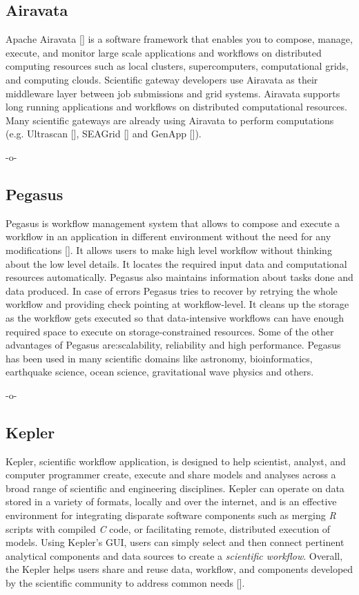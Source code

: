 \subsection{Airavata}

Apache Airavata [\cite{www-airavata}] is a software framework that
enables you to compose, manage, execute, and monitor large scale
applications and workflows on distributed computing resources such as
local clusters, supercomputers, computational grids, and computing
clouds. Scientific gateway developers use Airavata as their middleware
layer between job submissions and grid systems. Airavata supports long
running applications and workflows on distributed computational
resources. Many scientific gateways are already using Airavata to
perform computations (e.g. Ultrascan [\cite{www-ultrascan}],
SEAGrid [\cite{www-seagrid}] and GenApp [\cite{www-genapp}]).

   -o-

\subsection{Pegasus}\label{S:pegasus}

Pegasus is workflow management system that allows to compose and
execute a workflow in an application in different environment without
the need for any modifications [\cite{www-Pegasus}]. It allows users to
make high level workflow without thinking about the low level
details. It locates the required input data and computational
resources automatically.  Pegasus also maintains information about
tasks done and data produced. In case of errors Pegasus tries to
recover by retrying the whole workflow and providing check pointing at
workflow-level.  It cleans up the storage as the workflow gets
executed so that data-intensive workflows can have enough required
space to execute on storage-constrained resources. Some of the other
advantages of Pegasus are:scalability, reliability and high
performance. Pegasus has been used in many scientific domains like
astronomy, bioinformatics, earthquake science, ocean science,
gravitational wave physics and others.

   -o-


\subsection{Kepler}
 
Kepler, scientific workflow application, is designed to help
scientist, analyst, and computer programmer create, execute and share
models and analyses across a broad range of scientific and engineering
disciplines.  Kepler can operate on data stored in a variety of
formats, locally and over the internet, and is an effective
environment for integrating disparate software components such as
merging \textit{R} scripts with compiled \textit{C} code, or facilitating remote,
distributed execution of models. Using Kepler's GUI, users can simply
select and then connect pertinent analytical components and data
sources to create a \textit{scientific workflow}. Overall, the Kepler helps
users share and reuse data, workflow, and components developed by the
scientific community to address common needs [\cite{www-kepler}].

